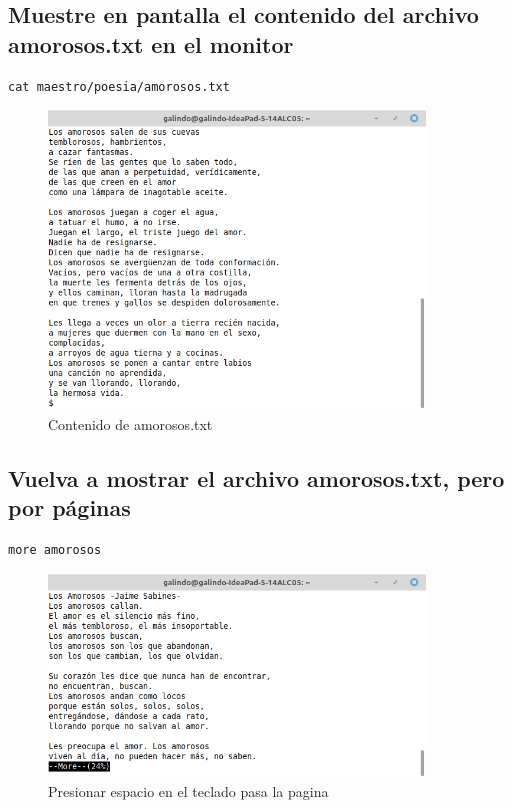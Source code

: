 \documentclass[11pt]{article}
\begin{document}
\subsection{Muestre en pantalla el contenido del archivo amorosos.txt en el monitor}
\label{sec:org9bf6123}
\begin{verbatim}
cat maestro/poesia/amorosos.txt
\end{verbatim}

\begin{figure}[htbp]
\centering
\includegraphics[width=10cm]{img/a10.png}
\caption{Contenido de amorosos.txt}
\end{figure}

\cite{linux_cat}

\subsection{Vuelva a mostrar el archivo amorosos.txt, pero por páginas}
\label{sec:org588743e}
\begin{verbatim}
more amorosos
\end{verbatim}

\begin{figure}[htbp]
\centering
\includegraphics[width=10cm]{img/a11.png}
\caption{Presionar espacio en el teclado pasa la pagina}
\end{figure}
\end{document}
